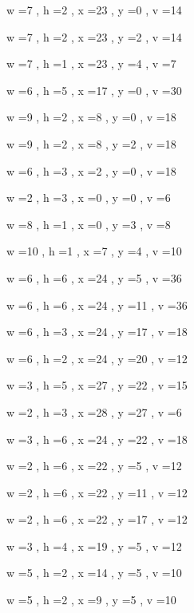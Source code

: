 \documentclass[11pt]{article}
\begin{document}


w =7 , h =2 , x =23 , y =0 , v =14
\par
w =7 , h =2 , x =23 , y =2 , v =14
\par
w =7 , h =1 , x =23 , y =4 , v =7
\par
w =6 , h =5 , x =17 , y =0 , v =30
\par
w =9 , h =2 , x =8 , y =0 , v =18
\par
w =9 , h =2 , x =8 , y =2 , v =18
\par
w =6 , h =3 , x =2 , y =0 , v =18
\par
w =2 , h =3 , x =0 , y =0 , v =6
\par
w =8 , h =1 , x =0 , y =3 , v =8
\par
w =10 , h =1 , x =7 , y =4 , v =10
\par
w =6 , h =6 , x =24 , y =5 , v =36
\par
w =6 , h =6 , x =24 , y =11 , v =36
\par
w =6 , h =3 , x =24 , y =17 , v =18
\par
w =6 , h =2 , x =24 , y =20 , v =12
\par
w =3 , h =5 , x =27 , y =22 , v =15
\par
w =2 , h =3 , x =28 , y =27 , v =6
\par
w =3 , h =6 , x =24 , y =22 , v =18
\par
w =2 , h =6 , x =22 , y =5 , v =12
\par
w =2 , h =6 , x =22 , y =11 , v =12
\par
w =2 , h =6 , x =22 , y =17 , v =12
\par
w =3 , h =4 , x =19 , y =5 , v =12
\par
w =5 , h =2 , x =14 , y =5 , v =10
\par
w =5 , h =2 , x =9 , y =5 , v =10
\par
\newpage
\end{document}
